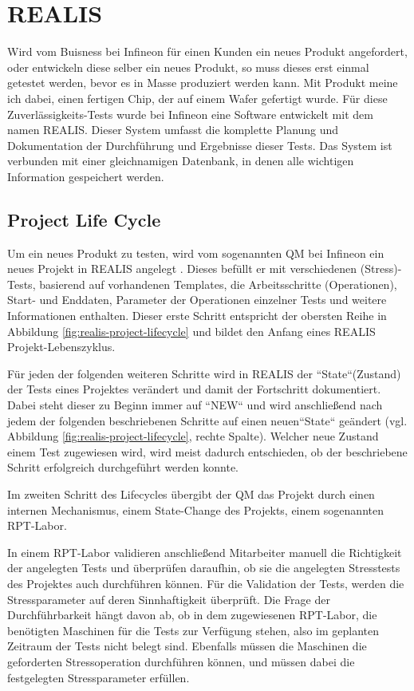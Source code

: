 \section{REALIS}\label{Sec:REALIS}
Wird vom Buisness bei Infineon für einen Kunden ein neues Produkt angefordert, oder entwickeln diese selber ein neues Produkt, so muss dieses erst einmal getestet werden, bevor es in Masse produziert werden kann. Mit Produkt meine ich dabei, einen fertigen Chip, der auf einem Wafer gefertigt wurde. Für diese Zuverlässigkeits-Tests wurde bei Infineon eine Software entwickelt mit dem namen \acf{REALIS}. Dieser System umfasst die komplette Planung und Dokumentation der Durchführung und Ergebnisse dieser Tests. Das System ist verbunden mit einer gleichnamigen Datenbank, in denen alle wichtigen Information gespeichert werden. 

\subsection{Project Life Cycle}
Um ein neues Produkt zu testen, wird vom sogenannten \ac{QM} bei Infineon ein neues Projekt in \ac{REALIS} angelegt . Dieses befüllt er mit verschiedenen (Stress)-Tests, basierend auf vorhandenen Templates, die Arbeitsschritte (Operationen), Start- und Enddaten, Parameter der Operationen einzelner Tests und weitere Informationen enthalten. Dieser erste Schritt entspricht der obersten Reihe in Abbildung \ref{fig:realis-project-lifecycle} und bildet den Anfang eines REALIS Projekt-Lebenszyklus. 

Für jeden der folgenden weiteren Schritte wird in \ac{REALIS} der ``State``(Zustand) der Tests eines Projektes verändert und damit der Fortschritt dokumentiert. Dabei steht dieser zu Beginn immer auf  ``NEW`` und wird anschließend nach jedem der folgenden beschriebenen Schritte auf einen neuen``State`` geändert (vgl. Abbildung \ref{fig:realis-project-lifecycle}, rechte Spalte). Welcher neue Zustand einem Test zugewiesen wird, wird meist dadurch entschieden, ob der beschriebene Schritt erfolgreich durchgeführt werden konnte.

Im zweiten Schritt des Lifecycles übergibt der \ac{QM} das Projekt durch einen internen Mechanismus, einem State-Change des Projekts, einem sogenannten  \ac{RPT}-Labor. 

In einem \ac{RPT}-Labor validieren anschließend Mitarbeiter manuell die Richtigkeit der angelegten Tests und überprüfen daraufhin, ob sie die angelegten Stresstests des Projektes auch durchführen können. 
Für die Validation der Tests, werden die Stressparameter auf deren Sinnhaftigkeit überprüft. Die Frage der Durchführbarkeit hängt davon ab, ob in dem zugewiesenen \ac{RPT}-Labor, die benötigten Maschinen für die Tests zur Verfügung stehen, also im geplanten Zeitraum der Tests nicht belegt sind. Ebenfalls müssen die Maschinen die geforderten Stressoperation durchführen können, und müssen dabei die festgelegten Stressparameter erfüllen.


